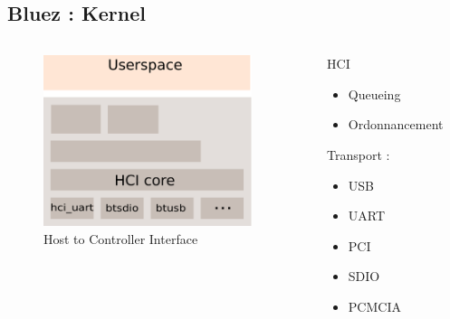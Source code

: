 \subsection{Bluez : Kernel}

\begin{frame}
	\begin{columns}[t]
\begin{column}{0.60\linewidth}
	\begin{figure}
		\includegraphics[height=5cm]{img/bluez_kernel_hci.png}
		\caption{Host to Controller Interface}
	\end{figure}
\end{column}
\begin{column}{0.40\linewidth}
	\begin{block}{HCI}
		\begin{itemize}
			\item Queueing
			\item Ordonnancement
		\end{itemize}
		Transport : 
		\begin{itemize}
			\item USB
			\item UART
			\item PCI
			\item SDIO
			\item PCMCIA
		\end{itemize}
	\end{block}
\end{column}
\end{columns}
\end{frame}

